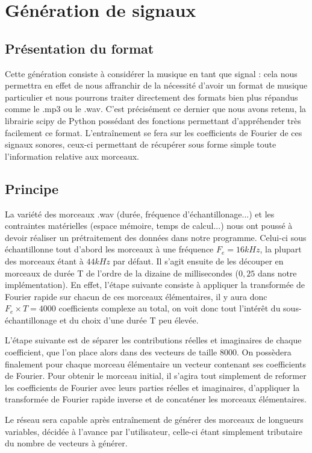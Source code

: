 \section{Génération de signaux}
\subsection{Présentation du format}
Cette génération consiste à considérer la musique en tant que signal : cela nous permettra en effet de nous affranchir de la nécessité d'avoir un format de musique particulier et nous pourrons traiter directement des formats bien plus répandus comme le .mp3 ou le .wav. C'est précisément ce dernier que nous avons retenu, la librairie scipy de Python possédant des fonctions permettant d'appréhender très facilement ce format. L'entraînement se fera sur les coefficients de Fourier de ces signaux sonores, ceux-ci permettant de récupérer sous forme simple toute l'information relative aux morceaux.

\subsection{Principe}
La variété des morceaux .wav (durée, fréquence d'échantillonage...) et les contraintes matérielles (espace mémoire, temps de calcul...) nous ont poussé à devoir réaliser un prétraitement des données dans notre programme. Celui-ci sous échantillonne tout d'abord les morceaux à une fréquence $F_e = 16kHz$, la plupart des morceaux étant à $44kHz$ par défaut. Il s'agit ensuite de les découper en morceaux de durée T de l'ordre de la dizaine de millisecondes ($0,25$ dans notre implémentation). En effet, l'étape suivante consiste à appliquer la transformée de Fourier rapide sur chacun de ces morceaux élémentaires, il y aura donc $F_e \times T = 4000$ coefficients complexe au total, on voit donc tout l'intérêt du sous-échantillonage et du choix d'une durée T peu élevée. 

L'étape suivante est de séparer les contributions réelles et imaginaires de chaque coefficient, que l'on place alors dans des vecteurs de taille 8000. On possèdera finalement pour chaque morceau élémentaire un vecteur contenant ses coefficients de Fourier. Pour obtenir le morceau initial, il s'agira tout simplement de reformer les coefficients de Fourier avec leurs parties réelles et imaginaires, d'appliquer la transformée de Fourier rapide inverse et de concaténer les morceaux élémentaires.

Le réseau sera capable après entraînement de générer des morceaux de longueurs variables, décidée à l'avance par l'utilisateur, celle-ci étant simplement tributaire du nombre de vecteurs à générer.

